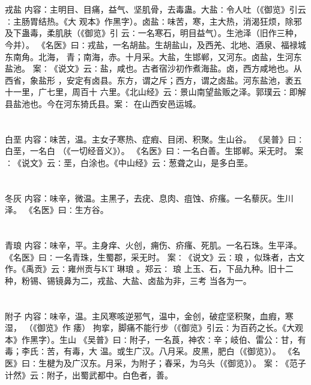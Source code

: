\documentclass[12pt,UTF8]{ctexbook}
\begin{document}
\section{}戎盐
内容：主明目、目痛，益气、坚肌骨，去毒蛊。大盐∶令人吐（《御览》引云∶主肠胃结热。《大 
观本》作黑字）。卤盐∶味苦，寒，主大热，消渴狂烦，除邪及下蛊毒，柔肌肤（《御览》引 
云∶一名寒石，明目益气）。生池泽（旧作三种，今并）。 
《名医》曰∶戎盐，一名胡盐。生胡盐山，及西羌、北地、酒泉、福禄城东南角。北海， 
青；南海，赤。十月采。大盐，生邯郸，又河东。卤盐，生河东盐池。 
案∶《说文》云∶盐，咸也。古者宿沙初作煮海盐。卤，西方咸地也。从西省，象盐形 
，安定有卤县。东方，谓之斥；西方，谓之卤盐。河东盐池，袤五十一里，广七里，周百十 
六里。《北山经》云∶景山南望盐贩之泽。郭璞云∶即解县盐池也。今在河东猗氏县。案∶ 
在山西安邑运城。 


\section{}白垩
内容：味苦，温。主女子寒热、症瘕、目闭、积聚。生山谷。 
《吴普》曰∶白垩，一名白 （《一切经音义》）。 
《名医》曰∶一名白善。生邯郸。采无时。 
案∶《说文》云∶垩，白涂也。《中山经》云∶葱聋之山，是多白垩。 


\section{}冬灰
内容：味辛，微温。主黑子，去疣、息肉、疽蚀、疥瘙。一名藜灰。生川泽。 
《名医》曰∶生方谷。 


\section{}青琅
内容：味辛，平。主身痒、火创，痈伤、疥瘙、死肌。一名石珠。生平泽。 
《名医》曰∶一名青珠，生蜀郡，采无时。 
案∶《说文》云∶琅 ，似珠者，古文作。《禹贡》云∶雍州贡与KT 琳琅 。郑云∶ 
琅 
上玉、石，下品九种。旧十二种，粉锡、锡镜鼻为二，戎盐、大盐、卤盐为非，三考 
当各为一。 


\section{}附子
内容：味辛，温。主风寒咳逆邪气，温中，金创，破症坚积聚，血瘕，寒湿， （《御览》作 
痿） 拘挛，脚痛不能行步（《御览》引云∶为百药之长。《大观本》作黑字）。生山 
《吴普》曰∶附子，一名莨，神农∶辛；岐伯、雷公∶甘，有毒；李氏∶苦，有毒，大 
温。或生广汉。八月采。皮黑，肥白（《御览》）。 
《名医》曰∶生楗为及广汉东。月采，为附子；春采，为乌头（《御览》）。 
案∶《范子计然》云∶附子，出蜀武都中。白色者，善。 
\end{document}
